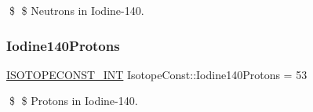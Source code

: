 \$ \$ Neutrons in Iodine-\/140. \mbox{\label{group___isotope_const-_iodine-_i140_gaedc6613ef8dfbb703b1c38315d1afe5e}} 
\subsubsection{\texorpdfstring{Iodine140\+Protons}{Iodine140Protons}}
{\footnotesize\ttfamily \mbox{\hyperlink{group___isotope_const-_macros_ga5f18360b3e99483a35c32d789e62621c}{I\+S\+O\+T\+O\+P\+E\+C\+O\+N\+S\+T\+\_\+\+I\+NT}} Isotope\+Const\+::\+Iodine140\+Protons = 53}

\$ \$ Protons in Iodine-\/140. 